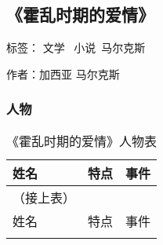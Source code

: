 \subsection{《霍乱时期的爱情》}

标签： 文学 \  小说\  马尔克斯

作者：加西亚 马尔克斯

\subsubsection{人物}

\begin{longtable}{p{} | p{} | p{}}

    \caption{《霍乱时期的爱情》人物表} \\
    \hline
姓名 & 特点 & 事件 \\
\hline
\endfirsthead

（接上表） \\
姓名 & 特点 & 事件 \\
\hline
\endhead

\hline
\endfoot


\end{longtable}
